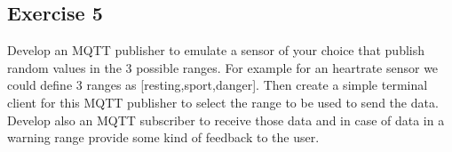 \documentclass[a4paper]{article}
\begin{document}
\subsection{Exercise 5}
\label{sec:org48924f3}

Develop an MQTT publisher to emulate a sensor of your choice that
publish random values in the 3 possible ranges. For example for an
heartrate sensor we could define 3 ranges as [resting,sport,danger].
Then create a simple terminal client for this MQTT publisher to select
the range to be used to send the data. Develop also an MQTT subscriber
to receive those data and in case of data in a warning range provide some kind
of feedback to the user.
\end{document}
